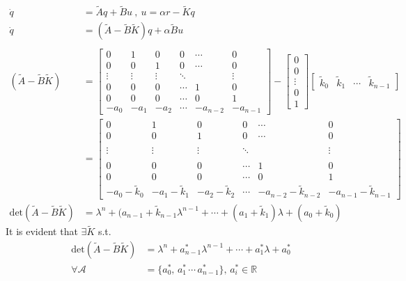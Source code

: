 \documentclass[twoside]{article}
\begin{document}
\begin{align*}
	\dot{q} &= \tilde{A} q + \tilde{B} u \ , \ u = \alpha r - \tilde{K} q 
 \\
 \dot{q} &= ( \tilde{A} - \tilde{B} \tilde{K} ) q + \alpha \tilde{B} u 
 \\
 \\
 ( \tilde{A} - \tilde{B} \tilde{K} ) &= 
 \left[ \begin{array}{c|c|c|c|c|c} 
0 & 1 & 0 & 0 & \cdots & 0 \\
0 & 0 & 1 &  0 & \cdots & 0 \\
\vdots & \vdots & \vdots & \ddots &  & \vdots \\
0 & 0 & 0 & \cdots  & 1 & 0 \\
0 & 0 & 0 & \cdots  & 0 & 1 \\
-a_{0} & -a_{1} & -a_{2} & \cdots  & -a_{n-2} & -a_{n-1} 
\end{array} \right] - \begin{bmatrix} 0 \\ 0 \\ \vdots \\ 0 \\ 1 \end{bmatrix}
\begin{bmatrix} \tilde{k}_0 & \tilde{k}_1 & \cdots & \tilde{k}_{n-1} \end{bmatrix}
\\
&=  \left[ \begin{array}{c|c|c|c|c|c} 
0 & 1 & 0 & 0 & \cdots & 0 \\
0 & 0 & 1 &  0 & \cdots & 0 \\
 &  &  &   &  &  
\\ 
\vdots & \vdots & \vdots & \ddots &  & \vdots \\
&  &  &   &  & 
\\ 
0 & 0 & 0 & \cdots  & 1 & 0 \\
0 & 0 & 0 & \cdots  & 0 & 1 \\
-a_{0}-\tilde{k}_0 & -a_{1}-\tilde{k}_1 & -a_{2}-\tilde{k}_2 & \cdots  & -a_{n-2}-\tilde{k}_{n-2} & -a_{n-1} - \tilde{k}_{n-1}
\end{array} \right]
\\
\mathrm{det}\left( \tilde{A} - \tilde{B} \tilde{K} \right) &=
\lambda^n + ( a_{n-1} + \tilde{k}_{n-1}  \lambda^{n-1}
	+ \cdots + ( a_{1} + \tilde{k}_1 )  \lambda + ( a_0 + \tilde{k}_0 )
\end{align*}
%
It is evident that $\exists \tilde{K}$ s.t. 
%
\begin{align*}
	\mathrm{det}\left( \tilde{A} - \tilde{B} \tilde{K} \right) &= \lambda^n + a_{n-1}^*  \lambda^{n-1}
	+ \cdots + a_{1}^* \lambda + a_0^*
	\\
	\forall \mathcal{A} &= \lbrace a_0^* , \, a_1^* \, \cdots \, a_{n-1}^* \rbrace , \, a_i^* \in \mathbb{R}
\end{align*} 
\end{document}

